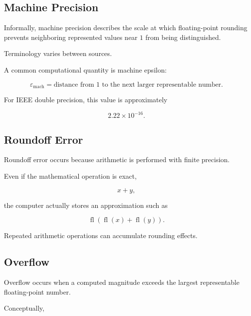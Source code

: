 \subsection{Machine Precision}
\label{subsec:machine-precision}

Informally, machine precision describes the scale at which floating-point
rounding prevents neighboring represented values near \(1\) from being
distinguished.

Terminology varies between sources.

A common computational quantity is machine epsilon:

\[
\boxed{
\varepsilon_{\mathrm{mach}}
=
\text{distance from }1
\text{ to the next larger representable number}.
}
\]

For IEEE double precision, this value is approximately

\[
\boxed{
2.22\times10^{-16}.
}
\]

\subsection{Roundoff Error}
\label{subsec:roundoff-error}

Roundoff error occurs because arithmetic is performed with finite
precision.

Even if the mathematical operation is exact,

\[
x+y,
\]

the computer actually stores an approximation such as

\[
\boxed{
\operatorname{fl}
(
\operatorname{fl}(x)
+
\operatorname{fl}(y)
).
}
\]

Repeated arithmetic operations can accumulate rounding effects.

\subsection{Overflow}
\label{subsec:numerical-overflow}

Overflow occurs when a computed magnitude exceeds the largest
representable floating-point number.

Conceptually,

